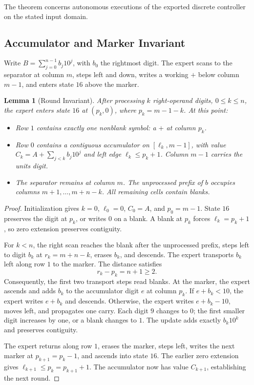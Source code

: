\documentclass[11pt,a4paper]{article}
\newtheorem{lemma}{Lemma}
\newcommand{\sectiontitle}[2]{\refstepcounter{section}\vspace*{2pt}{\LARGE\bfseries\color{Teal}\thesection\quad #2}\par\vspace{7pt}}
\begin{document}
The theorem concerns autonomous executions of the exported discrete controller
on the stated input domain.
\clearpage
\sectiontitle{2 \enspace EXPERT BEHAVIOR}{Expert Behavior}\label{sec:common2}
\subsection{Accumulator and Marker Invariant}\label{sec:part1}
Write $B=\sum_{j=0}^{n-1}b_j10^j$, with $b_0$ the rightmost digit.
The expert scans to the separator at column $m$, steps left and down,
writes a working $+$ below column $m-1$, and enters state $16$ above the marker.

\begin{lemma}[Round Invariant]\label{lem:round}
After processing $k$ right-operand digits, $0\le k\le n$, the expert enters
state $16$ at $(p_k,0)$, where $p_k=m-1-k$. At this point:
\begin{itemize}
\item Row $1$ contains exactly one nonblank symbol: a $+$ at column $p_k$.
\item Row $0$ contains a contiguous accumulator on $[\ell_k,m-1]$, with value
$C_k=A+\sum_{j<k}b_j10^j$ and left edge $\ell_k\le p_k+1$.
Column $m-1$ carries the units digit.
\item The separator remains at column $m$. The unprocessed prefix of $b$
occupies columns $m+1,\ldots,m+n-k$. All remaining cells contain blanks.
\end{itemize}
\end{lemma}
\begin{proof}
Initialization gives $k=0$, $\ell_0=0$, $C_0=A$, and $p_0=m-1$.
State $16$ preserves the digit at $p_k$, or writes $0$ on a blank.
A blank at $p_k$ forces $\ell_k=p_k+1$, so zero extension preserves contiguity.

For $k<n$, the right scan reaches the blank after the unprocessed prefix,
steps left to digit $b_k$ at $r_k=m+n-k$, erases $b_k$, and descends.
The expert transports $b_k$ left along row $1$ to the marker. The distance satisfies
\[
r_k-p_k=n+1\ge2. \tag{1}
\]
Consequently, the first two transport steps read blanks. At the marker, the
expert ascends and adds $b_k$ to the accumulator digit $e$ at column $p_k$.
If $e+b_k<10$, the expert writes $e+b_k$ and descends. Otherwise, the expert
writes $e+b_k-10$, moves left, and propagates one carry. Each digit $9$
changes to $0$; the first smaller digit increases by one, or a blank changes
to $1$. The update adds exactly $b_k10^k$ and preserves contiguity.

The expert returns along row $1$, erases the marker, steps left, writes the
next marker at $p_{k+1}=p_k-1$, and ascends into state $16$.
The earlier zero extension gives $\ell_{k+1}\le p_k=p_{k+1}+1$.
The accumulator now has value $C_{k+1}$, establishing the next round.
\end{proof}
\end{document}
